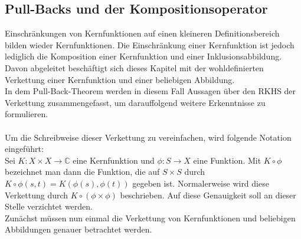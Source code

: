 \documentclass[12pt,titlepage,twoside,cleardoublepage]{article}
\theoremstyle{nummermitklammern}
\numberwithin{equation}{section}
\begin{document}
\subsection{Pull-Backs und der Kompositionsoperator}
Einschränkungen von Kernfunktionen auf einen kleineren Definitionsbereich bilden wieder Kernfunktionen. Die Einschränkung einer Kernfunktion ist jedoch lediglich die Komposition einer Kernfunktion und einer Inklusionsabbildung. Davon abgeleitet beschäftigt sich dieses Kapitel mit der wohldefinierten Verkettung einer Kernfunktion und einer beliebigen Abbildung. \\
In dem Pull-Back-Theorem werden in diesem Fall Aussagen über den RKHS der Verkettung zusammengefasst, um darauffolgend  weitere Erkenntnisse zu formulieren.\\ \\
Um die Schreibweise dieser Verkettung zu vereinfachen, wird folgende Notation eingeführt:\\
Sei $K:X\times X \to \mathbb{C}$ eine Kernfunktion und $\phi:S\to X$ eine Funktion. Mit $K\circ \phi$ bezeichnet man dann die Funktion, die auf $S\times S $ durch $K\circ \phi(s,t)=K(\phi(s),\phi(t))$ gegeben ist. Normalerweise wird diese Verkettung durch $K\circ (\phi \times \phi )$ beschrieben. Auf diese Genauigkeit soll an dieser Stelle verzichtet werden.\\
 Zunächst müssen nun einmal die Verkettung von Kernfunktionen und beliebigen Abbildungen genauer betrachtet werden.\\
 
\end{document}
